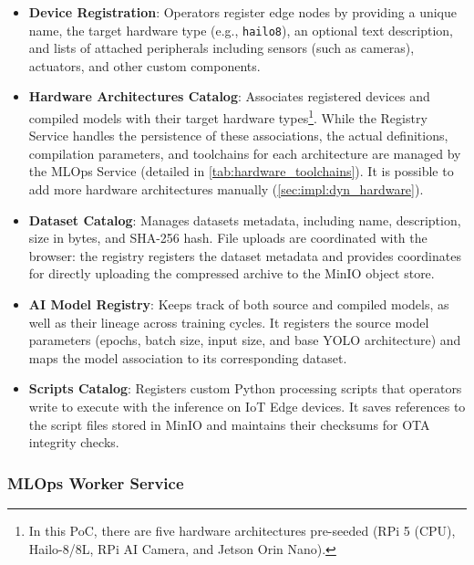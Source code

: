 \begin{itemize}
    \item \textbf{Device Registration}: Operators register edge nodes by providing a unique name, the target hardware type (e.g., \texttt{hailo8}), an optional text description, and lists of attached peripherals including sensors (such as cameras), actuators, and other custom components.
    
    \item \textbf{Hardware Architectures Catalog}: Associates registered devices and compiled models with their target hardware types\footnote{In this \gls{PoC}, there are five hardware architectures pre-seeded (\gls{RPi} 5 (\gls{CPU}), Hailo-8/8L, \gls{RPi} \gls{AI} Camera, and Jetson Orin Nano).}. While the Registry Service handles the persistence of these associations, the actual definitions, compilation parameters, and toolchains for each architecture are managed by the \gls{MLOps} Service (detailed in \autoref{tab:hardware_toolchains}). It is possible to add more hardware architectures manually (\autoref{sec:impl:dyn_hardware}).
    
    \item \textbf{Dataset Catalog}: Manages datasets metadata, including name, description, size in bytes, and SHA-256 hash. File uploads are coordinated with the browser: the registry registers the dataset metadata and provides coordinates for directly uploading the compressed archive to the MinIO object store.
    
    \item \textbf{\gls{AI} Model Registry}: Keeps track of both source and compiled models, as well as their lineage across training cycles. It registers the source model parameters (epochs, batch size, input size, and base YOLO architecture) and maps the model association to its corresponding dataset.
    
    \item \textbf{Scripts Catalog}: Registers custom Python processing scripts that operators write to execute with the inference on \gls{IoT} Edge devices. It saves references to the script files stored in MinIO and maintains their checksums for \gls{OTA} integrity checks.
\end{itemize}

\subsubsection{\texorpdfstring{\acrshort{MLOps}}{MLOps} Worker Service}\label{sec:impl:mlops_worker_svc}

